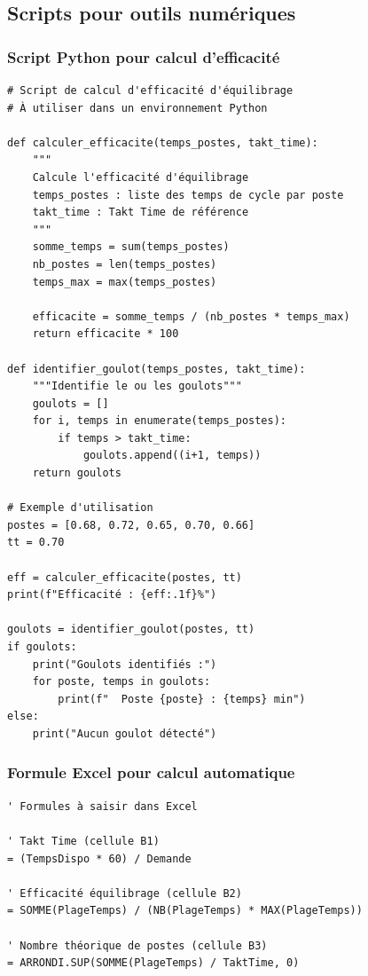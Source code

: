 \documentclass[12pt,a4paper]{article}
\begin{document}
\begin{center}
\subsection{Scripts pour outils numériques}

\subsubsection{Script Python pour calcul d'efficacité}

\begin{verbatim}
# Script de calcul d'efficacité d'équilibrage
# À utiliser dans un environnement Python

def calculer_efficacite(temps_postes, takt_time):
    """
    Calcule l'efficacité d'équilibrage
    temps_postes : liste des temps de cycle par poste
    takt_time : Takt Time de référence
    """
    somme_temps = sum(temps_postes)
    nb_postes = len(temps_postes)
    temps_max = max(temps_postes)
    
    efficacite = somme_temps / (nb_postes * temps_max)
    return efficacite * 100

def identifier_goulot(temps_postes, takt_time):
    """Identifie le ou les goulots"""
    goulots = []
    for i, temps in enumerate(temps_postes):
        if temps > takt_time:
            goulots.append((i+1, temps))
    return goulots

# Exemple d'utilisation
postes = [0.68, 0.72, 0.65, 0.70, 0.66]
tt = 0.70

eff = calculer_efficacite(postes, tt)
print(f"Efficacité : {eff:.1f}%")

goulots = identifier_goulot(postes, tt)
if goulots:
    print("Goulots identifiés :")
    for poste, temps in goulots:
        print(f"  Poste {poste} : {temps} min")
else:
    print("Aucun goulot détecté")
\end{verbatim}

\subsubsection{Formule Excel pour calcul automatique}

\begin{verbatim}
' Formules à saisir dans Excel

' Takt Time (cellule B1)
= (TempsDispo * 60) / Demande

' Efficacité équilibrage (cellule B2)
= SOMME(PlageTemps) / (NB(PlageTemps) * MAX(PlageTemps))

' Nombre théorique de postes (cellule B3)
= ARRONDI.SUP(SOMME(PlageTemps) / TaktTime, 0)


\end{verbatim}
\end{center}
\end{document}
